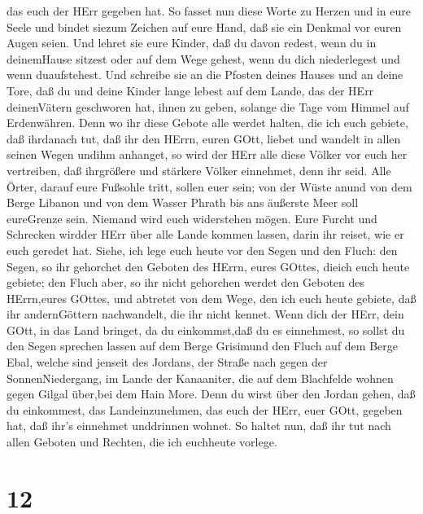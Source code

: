das euch der HErr gegeben hat.  So fasset nun diese Worte
zu Herzen und in eure Seele und bindet siezum Zeichen auf eure Hand, daß
sie ein Denkmal vor euren Augen seien.  Und lehret sie eure
Kinder, daß du davon redest, wenn du in deinemHause sitzest oder auf dem
Wege gehest, wenn du dich niederlegest und wenn duaufstehest.
 Und schreibe sie an die Pfosten deines Hauses und an deine
Tore,  daß du und deine Kinder lange lebest auf dem Lande,
das der HErr deinenVätern geschworen hat, ihnen zu geben, solange die
Tage vom Himmel auf Erdenwähren.  Denn wo ihr diese Gebote
alle werdet halten, die ich euch gebiete, daß ihrdanach tut, daß ihr den
HErrn, euren GOtt, liebet und wandelt in allen seinen Wegen undihm
anhanget,  so wird der HErr alle diese Völker vor euch her
vertreiben, daß ihrgrößere und stärkere Völker einnehmet, denn ihr seid.
 Alle Örter, darauf eure Fußsohle tritt, sollen euer sein;
von der Wüste anund von dem Berge Libanon und von dem Wasser Phrath bis
ans äußerste Meer soll eureGrenze sein.  Niemand wird euch
widerstehen mögen. Eure Furcht und Schrecken wirdder HErr über alle
Lande kommen lassen, darin ihr reiset, wie er euch geredet hat.
 Siehe, ich lege euch heute vor den Segen und den Fluch:
 den Segen, so ihr gehorchet den Geboten des HErrn, eures
GOttes, dieich euch heute gebiete;  den Fluch aber, so ihr
nicht gehorchen werdet den Geboten des HErrn,eures GOttes, und abtretet
von dem Wege, den ich euch heute gebiete, daß ihr andernGöttern
nachwandelt, die ihr nicht kennet.  Wenn dich der HErr,
dein GOtt, in das Land bringet, da du einkommst,daß du es einnehmest, so
sollst du den Segen sprechen lassen auf dem Berge Grisimund den Fluch
auf dem Berge Ebal,  welche sind jenseit des Jordans, der
Straße nach gegen der SonnenNiedergang, im Lande der Kanaaniter, die auf
dem Blachfelde wohnen gegen Gilgal über,bei dem Hain More. 
Denn du wirst über den Jordan gehen, daß du einkommest, das
Landeinzunehmen, das euch der HErr, euer GOtt, gegeben hat, daß ihr's
einnehmet unddrinnen wohnet.  So haltet nun, daß ihr tut
nach allen Geboten und Rechten, die ich euchheute vorlege.

\hypertarget{section-11}{%
\section{12}\label{section-11}}

